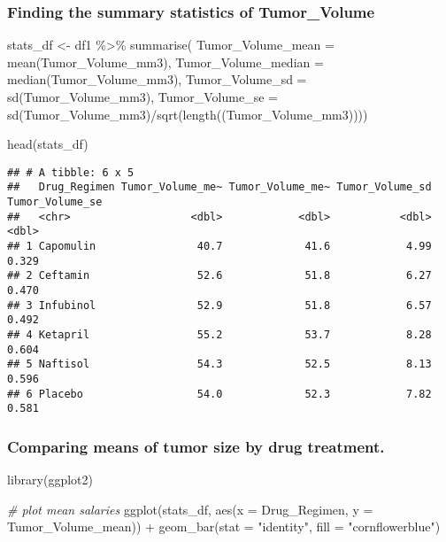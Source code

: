 \documentclass[
]{article}
\newenvironment{Shaded}{\begin{snugshade}}{\end{snugshade}}
\newcommand{\AttributeTok}[1]{\textcolor[rgb]{0.77,0.63,0.00}{#1}}
\newcommand{\CommentTok}[1]{\textcolor[rgb]{0.56,0.35,0.01}{\textit{#1}}}
\newcommand{\FunctionTok}[1]{\textcolor[rgb]{0.00,0.00,0.00}{#1}}
\newcommand{\NormalTok}[1]{#1}
\newcommand{\OtherTok}[1]{\textcolor[rgb]{0.56,0.35,0.01}{#1}}
\newcommand{\SpecialCharTok}[1]{\textcolor[rgb]{0.00,0.00,0.00}{#1}}
\newcommand{\StringTok}[1]{\textcolor[rgb]{0.31,0.60,0.02}{#1}}
\begin{document}
\hypertarget{finding-the-summary-statistics-of-tumor_volume}{%
\subsubsection{Finding the summary statistics of
Tumor\_Volume}\label{finding-the-summary-statistics-of-tumor_volume}}

\begin{Shaded}
\begin{Highlighting}[]
\NormalTok{stats\_df }\OtherTok{\textless{}{-}}\NormalTok{ df1 }\SpecialCharTok{\%\textgreater{}\%} \FunctionTok{summarise}\NormalTok{(}
  \AttributeTok{Tumor\_Volume\_mean =} \FunctionTok{mean}\NormalTok{(Tumor\_Volume\_mm3), }\AttributeTok{Tumor\_Volume\_median =} \FunctionTok{median}\NormalTok{(Tumor\_Volume\_mm3), }\AttributeTok{Tumor\_Volume\_sd =} \FunctionTok{sd}\NormalTok{(Tumor\_Volume\_mm3), }\AttributeTok{Tumor\_Volume\_se =} \FunctionTok{sd}\NormalTok{(Tumor\_Volume\_mm3)}\SpecialCharTok{/}\FunctionTok{sqrt}\NormalTok{(}\FunctionTok{length}\NormalTok{((Tumor\_Volume\_mm3))))}

\FunctionTok{head}\NormalTok{(stats\_df)}
\end{Highlighting}
\end{Shaded}

\begin{verbatim}
## # A tibble: 6 x 5
##   Drug_Regimen Tumor_Volume_me~ Tumor_Volume_me~ Tumor_Volume_sd Tumor_Volume_se
##   <chr>                   <dbl>            <dbl>           <dbl>           <dbl>
## 1 Capomulin                40.7             41.6            4.99           0.329
## 2 Ceftamin                 52.6             51.8            6.27           0.470
## 3 Infubinol                52.9             51.8            6.57           0.492
## 4 Ketapril                 55.2             53.7            8.28           0.604
## 5 Naftisol                 54.3             52.5            8.13           0.596
## 6 Placebo                  54.0             52.3            7.82           0.581
\end{verbatim}

\hypertarget{comparing-means-of-tumor-size-by-drug-treatment.}{%
\subsubsection{Comparing means of tumor size by drug
treatment.}\label{comparing-means-of-tumor-size-by-drug-treatment.}}

\begin{Shaded}
\begin{Highlighting}[]
\FunctionTok{library}\NormalTok{(ggplot2)}

\CommentTok{\# plot mean salaries}
\FunctionTok{ggplot}\NormalTok{(stats\_df, }
       \FunctionTok{aes}\NormalTok{(}\AttributeTok{x =}\NormalTok{ Drug\_Regimen, }
           \AttributeTok{y =}\NormalTok{ Tumor\_Volume\_mean)) }\SpecialCharTok{+}
  \FunctionTok{geom\_bar}\NormalTok{(}\AttributeTok{stat =} \StringTok{"identity"}\NormalTok{,  }\AttributeTok{fill =} \StringTok{"cornflowerblue"}\NormalTok{)}
\end{Highlighting}
\end{Shaded}
\end{document}
